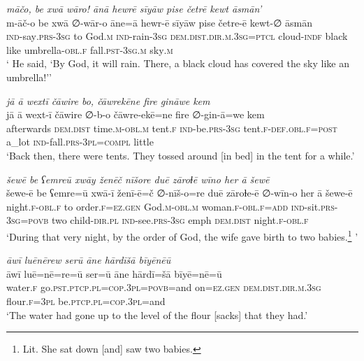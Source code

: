 \ea \label{ZB.17}
\textit{māčo, be xwā wāro! ānā hewrē sīyāw pise četrē kewt āsmān’} \\ 
\gll m-āč-o be xwā ∅-wār-o āne=ā hewr-ē sīyāw pise četre-ē kewt-∅ āsmān \\ 
 \textsc{ind-}say\textsc{.prs}\textsc{-3sg} to God\textsc{.m} \textsc{ind-}rain\textsc{-3sg} \textsc{dem.dist}\textsc{.dir}\textsc{.m}\textsc{.3sg}=\textsc{ptcl} cloud\textsc{-indf} black like umbrella\textsc{-obl}\textsc{.f} fall\textsc{.pst}\textsc{-3sg}\textsc{.m} sky\textsc{.m} \\ 
\glt ` He said, ‘By God, it will rain. There, a black cloud has covered the sky like an umbrella!’'
\z 
 
\ea \label{ZB.19}
\textit{jā ā wextī čāwire bo, čāwrekēne fire gināwe kem} \\ 
\gll jā ā wext-ī čāwire ∅-b-o čāwre-ekē=ne fire ∅-gin-ā=we kem \\ 
 afterwards \textsc{dem.dist} time\textsc{.m}\textsc{-obl}\textsc{.m} tent\textsc{.f} \textsc{ind-}be\textsc{.prs}\textsc{-3sg} tent\textsc{.f}\textsc{-def}\textsc{.obl}\textsc{.f}\textsc{=\textsc{post}} a\_lot \textsc{ind-}fall\textsc{.prs}\textsc{-3pl}\textsc{=compl} little \\ 
\glt `Back then, there were tents. They tossed around [in bed] in the tent for a while.'
\z 
 
\ea \label{ZB.24}
\textit{šewē be ʕemreū xwāy ženēč nīšore duē zāroɫē wīno her ā šewē} \\ 
\gll šewe-ē be ʕemre=ū xwā-ī ženī-ē=č ∅-nīš-o=re duē zāroɫe-ē ∅-wīn-o her ā šewe-ē \\ 
 night\textsc{.f}\textsc{-obl}\textsc{.f} to order\textsc{.f}\textsc{\textsc{=ez.gen}} God\textsc{.m}\textsc{-obl}\textsc{.m} woman\textsc{.f}\textsc{-obl}\textsc{.f}\textsc{=add} \textsc{ind-}sit\textsc{.prs}\textsc{-3sg}\textsc{=\textsc{povb}} two child\textsc{-dir}\textsc{.pl} \textsc{ind-}see\textsc{.prs}\textsc{-3sg} emph \textsc{dem.dist} night\textsc{.f}\textsc{-obl}\textsc{.f} \\ 
\glt `During that very night, by the order of God, the wife gave birth to two babies.\footnote{Lit. She sat down [and] saw two babies.} '
\z 
 
\ea \label{ZB.28}
\textit{āwī luēnērew serū āne hārdīšā bīyēnēū} \\ 
\gll āwī luē=nē=re=ū ser=ū āne hārdī=šā bīyē=nē=ū \\ 
 water\textsc{.f} go\textsc{.pst}\textsc{.ptcp}\textsc{.pl}\textsc{=cop}\textsc{.3pl}\textsc{=\textsc{povb}}=and on\textsc{\textsc{=ez.gen}} \textsc{dem.dist}\textsc{.dir}\textsc{.m}\textsc{.3sg} flour\textsc{.f}\textsc{=3pl} be\textsc{.ptcp}\textsc{.pl}\textsc{=cop}\textsc{.3pl}=and \\ 
\glt `The water had gone up to the level of the flour [sacks] that they had.'
\z 
 

